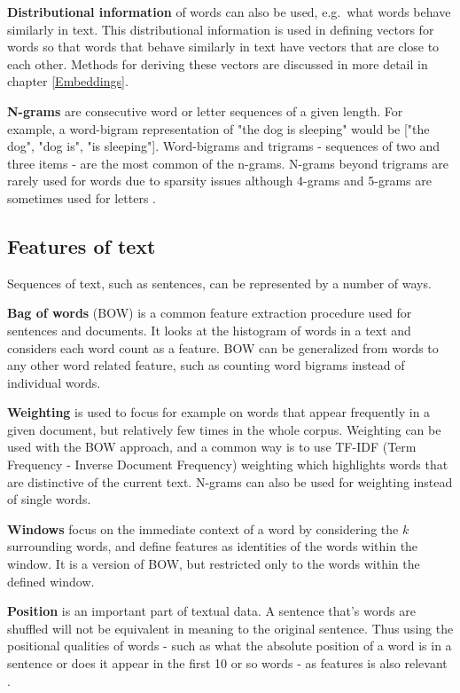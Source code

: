 \textbf{Distributional information} of words can also be used, e.g.\ what words behave similarly in text.
This distributional information is used in defining vectors for words so that words that behave similarly in text have vectors that are close to each other.
Methods for deriving these vectors are discussed in more detail in chapter \ref{Embeddings}.

\textbf{N-grams} are consecutive word or letter sequences of a given length.
For example, a word-bigram representation of "the dog is sleeping" would be ["the dog", "dog is", "is sleeping"].
Word-bigrams and trigrams - sequences of two and three items - are the most common of the n-grams.
N-grams beyond trigrams are rarely used for words due to sparsity issues although 4-grams and 5-grams are sometimes used for letters \cite{goldberg2017}.

\subsection{Features of text}\label{Features of text}
Sequences of text, such as sentences, can be represented by a number of ways.

\textbf{Bag of words} (BOW) is a common feature extraction procedure used for sentences and documents.
It looks at the histogram of words in a text and considers each word count as a feature.
BOW can be generalized from words to any other word related feature, such as counting word bigrams instead of individual words.

\textbf{Weighting} is used to focus for example on words that appear frequently in a given document, but relatively few times in the whole corpus.
Weighting can be used with the BOW approach, and a common way is to use TF-IDF (Term Frequency - Inverse Document Frequency) weighting which highlights words that are distinctive of the current text.
N-grams can also be used for weighting instead of single words.

\textbf{Windows} focus on the immediate context of a word by considering the $k$ surrounding words, and define features as identities of the words within the window.
It is a version of BOW, but restricted only to the words within the defined window.

\textbf{Position} is an important part of textual data.
A sentence that's words are shuffled will not be equivalent in meaning to the original sentence.
Thus using the positional qualities of words - such as what the absolute position of a word is in a sentence or does it appear in the first 10 or so words - as features is also relevant \cite{goldberg2017}.

